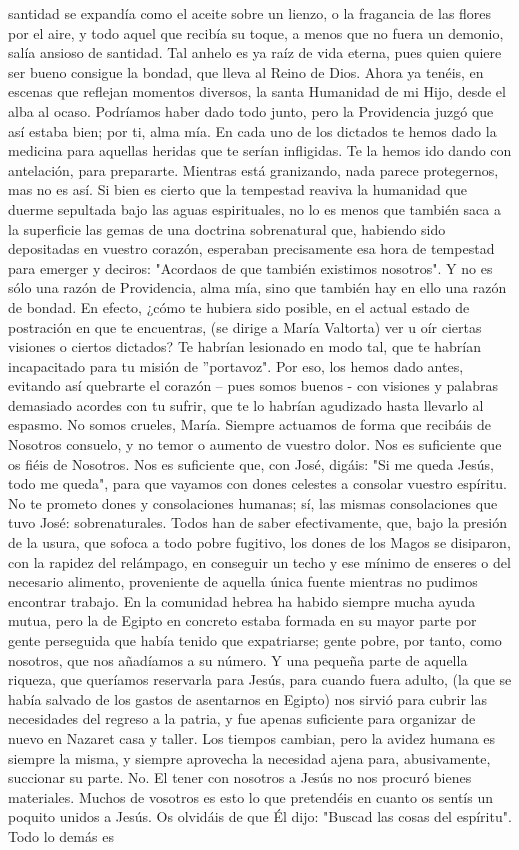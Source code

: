 \documentclass[12pt, twoside, openright]{book} %
\begin{document}
santidad se expandía como el aceite sobre un lienzo, o la fragancia de las flores por el aire, y todo aquel que recibía su toque, a menos que no fuera un demonio, salía ansioso de santidad. Tal anhelo es ya raíz de vida eterna, pues quien quiere ser bueno consigue la bondad, que lleva al Reino de Dios. Ahora ya tenéis, en escenas que reflejan momentos diversos, la santa Humanidad de mi Hijo, desde el alba al ocaso. Podríamos haber dado todo junto, pero la Providencia juzgó que así estaba bien; por ti, alma mía. En cada uno de los dictados te hemos dado la medicina para aquellas heridas que te serían infligidas. Te la hemos ido dando con antelación, para prepararte. Mientras está granizando, nada parece protegernos, mas no es así. Si bien es cierto que la tempestad reaviva la humanidad que duerme sepultada bajo las aguas espirituales, no lo es menos que también saca a la superficie las gemas de una doctrina sobrenatural que, habiendo sido depositadas en vuestro corazón, esperaban precisamente esa hora de tempestad para emerger y deciros: "Acordaos de que también existimos nosotros". Y no es sólo una razón de Providencia, alma mía, sino que también hay en ello una razón de bondad. En efecto, ¿cómo te hubiera sido posible, en el actual estado de postración en que te encuentras, (se dirige a María Valtorta) ver u oír ciertas visiones o ciertos dictados? Te habrían lesionado en modo tal, que te habrían incapacitado para tu misión de ''portavoz". Por eso, los hemos dado antes, evitando así quebrarte el corazón – pues somos buenos - con visiones y palabras demasiado acordes con tu sufrir, que te lo habrían agudizado hasta llevarlo al espasmo. No somos crueles, María. Siempre actuamos de forma que recibáis de Nosotros consuelo, y no temor o aumento de vuestro dolor. Nos es suficiente que os fiéis de Nosotros. Nos es suficiente que, con José, digáis: "Si me queda Jesús, todo me queda", para que vayamos con dones celestes a consolar vuestro espíritu. No te prometo dones y consolaciones humanas; sí, las mismas consolaciones que tuvo José: sobrenaturales. Todos han de saber efectivamente, que, bajo la presión de la usura, que sofoca a todo pobre fugitivo, los dones de los Magos se disiparon, con la rapidez del relámpago, en conseguir un techo y ese mínimo de enseres o del necesario alimento, proveniente de aquella única fuente mientras no pudimos encontrar trabajo. En la comunidad hebrea ha habido siempre mucha ayuda mutua, pero la de Egipto en concreto estaba formada en su mayor parte por gente perseguida que había tenido que expatriarse; gente pobre, por tanto, como nosotros, que nos añadíamos a su número. Y una pequeña parte de aquella riqueza, que queríamos reservarla para Jesús, para cuando fuera adulto, (la que se había salvado de los gastos de asentarnos en Egipto) nos sirvió para cubrir las necesidades del regreso a la patria, y fue apenas suficiente para organizar de nuevo en Nazaret casa y taller. Los tiempos cambian, pero la avidez humana es siempre la misma, y siempre aprovecha la necesidad ajena para, abusivamente, succionar su parte. No. El tener con nosotros a Jesús no nos procuró bienes materiales. Muchos de vosotros es esto lo que pretendéis en cuanto os sentís un poquito unidos a Jesús. Os olvidáis de que Él dijo: "Buscad las cosas del espíritu". Todo lo demás es 
\end{document}
